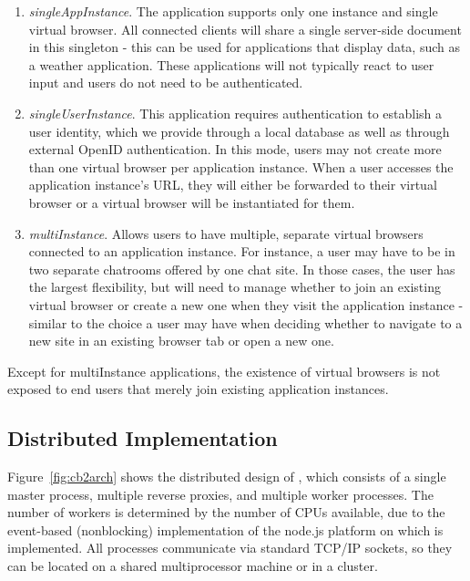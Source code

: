 \begin{enumerate}
\item \emph{singleAppInstance}. The application supports only one instance and single virtual browser.
    All connected clients will share a single server-side document in this singleton - this can be
    used for applications that display data, such as a weather application. These applications will not
    typically react to user input and users do not need to be authenticated.  
    
\item \emph{singleUserInstance}.  This application requires authentication to establish a
    user identity, which we provide through a local database as well as through external OpenID
    authentication.   In this mode, users may not create more than one virtual browser per
    application instance.  When a user accesses the application instance's URL, they will either
    be forwarded to their virtual browser or a virtual browser will be instantiated for them.
    
\item \emph{multiInstance}. 
    Allows users to have multiple, separate virtual browsers connected to an application
    instance. For instance, a user may have to be in two separate chatrooms offered by one chat site.
    In those cases, the user has the largest flexibility, but will need to manage whether
    to join an existing virtual browser or create a new one when they visit the application instance
    - similar to the choice a user may have when deciding whether to navigate to a new site in 
    an existing browser tab or open a new one.
\end{enumerate}
Except for multiInstance applications, the existence of virtual browsers is not exposed to 
end users that merely join existing application instances.

\apphierarchyfig{}
%
%
\newarchitectureoverview{}
%
\subsection{Distributed Implementation}
\label{sec:distribution}
Figure~\ref{fig:cb2arch} shows the distributed design of \cbtwo, which consists of a single
master process, multiple reverse proxies, and multiple worker processes.  The number of workers 
is determined by the number of CPUs available, due to the event-based (nonblocking) implementation
of the node.js platform on which \cb is implemented.
All processes communicate via standard TCP/IP sockets, so they can be located on a shared multiprocessor 
machine or in a cluster.

